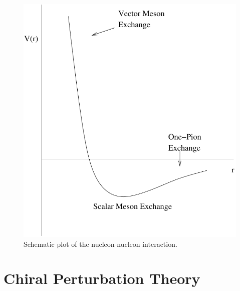 \begin{figure}[htp]
\centering
\includegraphics[scale=0.50]{nucleon-nucleon_pot}
\caption{Schematic plot of the nucleon-nucleon interaction.}
\label{nucleon_pot}
\end{figure}



\section{Chiral Perturbation Theory}

